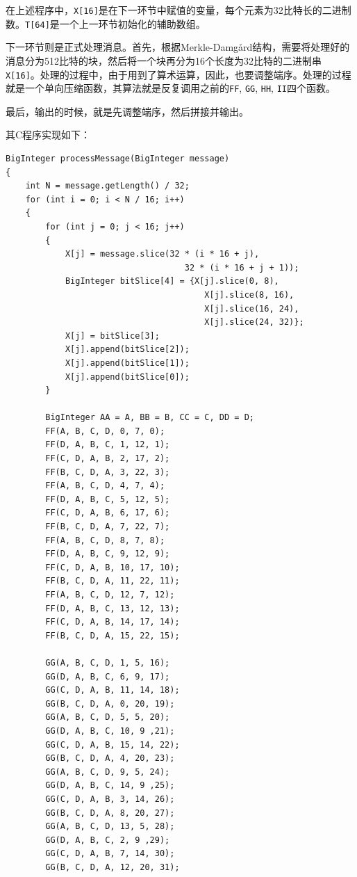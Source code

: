 在上述程序中，\verb`X[16]`是在下一环节中赋值的变量，每个元素为32比特长的二进制数。\verb`T[64]`是一个上一环节初始化的辅助数组。\par
下一环节则是正式处理消息。首先，根据Merkle-Damg\aa rd结构，需要将处理好的消息分为512比特的块，然后将一个块再分为16个长度为32比特的二进制串\verb`X[16]`。处理的过程中，由于用到了算术运算，因此，也要调整端序。处理的过程就是一个单向压缩函数，其算法就是反复调用之前的\verb`FF`, \verb`GG`, \verb`HH`, \verb`II`四个函数。\par
最后，输出的时候，就是先调整端序，然后拼接并输出。\par
其C程序实现如下：
\begin{prove}
\begin{verbatim}
BigInteger processMessage(BigInteger message)
{
    int N = message.getLength() / 32;
    for (int i = 0; i < N / 16; i++)
    {
        for (int j = 0; j < 16; j++)
        {
            X[j] = message.slice(32 * (i * 16 + j), 
                                    32 * (i * 16 + j + 1));
            BigInteger bitSlice[4] = {X[j].slice(0, 8), 
                                        X[j].slice(8, 16), 
                                        X[j].slice(16, 24), 
                                        X[j].slice(24, 32)};
            X[j] = bitSlice[3];
            X[j].append(bitSlice[2]);
            X[j].append(bitSlice[1]);
            X[j].append(bitSlice[0]);
        }
        
        BigInteger AA = A, BB = B, CC = C, DD = D;
        FF(A, B, C, D, 0, 7, 0);
        FF(D, A, B, C, 1, 12, 1);
        FF(C, D, A, B, 2, 17, 2);
        FF(B, C, D, A, 3, 22, 3);
        FF(A, B, C, D, 4, 7, 4);
        FF(D, A, B, C, 5, 12, 5);
        FF(C, D, A, B, 6, 17, 6);
        FF(B, C, D, A, 7, 22, 7);
        FF(A, B, C, D, 8, 7, 8);
        FF(D, A, B, C, 9, 12, 9);
        FF(C, D, A, B, 10, 17, 10);
        FF(B, C, D, A, 11, 22, 11);
        FF(A, B, C, D, 12, 7, 12);
        FF(D, A, B, C, 13, 12, 13);
        FF(C, D, A, B, 14, 17, 14);
        FF(B, C, D, A, 15, 22, 15);
        
        GG(A, B, C, D, 1, 5, 16);
        GG(D, A, B, C, 6, 9, 17);
        GG(C, D, A, B, 11, 14, 18);
        GG(B, C, D, A, 0, 20, 19);
        GG(A, B, C, D, 5, 5, 20);
        GG(D, A, B, C, 10, 9 ,21);
        GG(C, D, A, B, 15, 14, 22);
        GG(B, C, D, A, 4, 20, 23);
        GG(A, B, C, D, 9, 5, 24);
        GG(D, A, B, C, 14, 9 ,25);
        GG(C, D, A, B, 3, 14, 26);
        GG(B, C, D, A, 8, 20, 27);
        GG(A, B, C, D, 13, 5, 28);
        GG(D, A, B, C, 2, 9 ,29);
        GG(C, D, A, B, 7, 14, 30);
        GG(B, C, D, A, 12, 20, 31);
        

\end{verbatim}
\end{prove}
